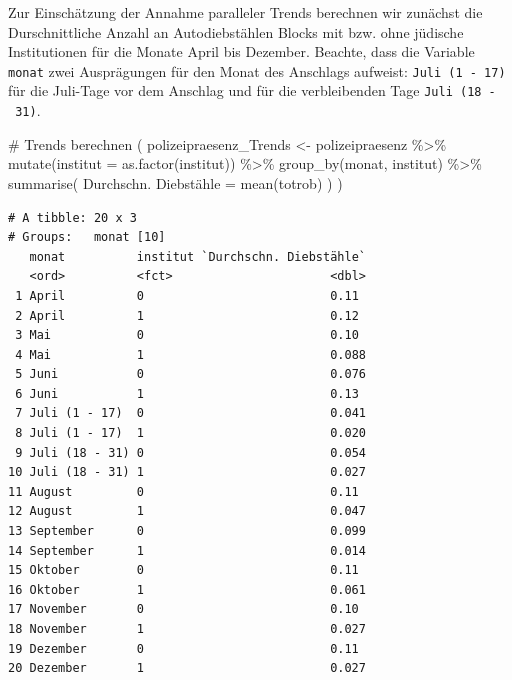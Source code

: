 \documentclass[
  a4paper,
  DIV=11,
  oneside]{scrreprt}
\newenvironment{Shaded}{\begin{snugshade}}{\end{snugshade}}
\newcommand{\AttributeTok}[1]{\textcolor[rgb]{0.40,0.45,0.13}{#1}}
\newcommand{\CommentTok}[1]{\textcolor[rgb]{0.37,0.37,0.37}{#1}}
\newcommand{\FunctionTok}[1]{\textcolor[rgb]{0.28,0.35,0.67}{#1}}
\newcommand{\NormalTok}[1]{\textcolor[rgb]{0.00,0.23,0.31}{#1}}
\newcommand{\OtherTok}[1]{\textcolor[rgb]{0.00,0.23,0.31}{#1}}
\newcommand{\SpecialCharTok}[1]{\textcolor[rgb]{0.37,0.37,0.37}{#1}}
\newcommand{\StringTok}[1]{\textcolor[rgb]{0.13,0.47,0.30}{#1}}
\begin{document}
Zur Einschätzung der Annahme paralleler Trends berechnen wir zunächst
die Durschnittliche Anzahl an Autodiebstählen Blocks mit bzw. ohne
jüdische Institutionen für die Monate April bis Dezember. Beachte, dass
die Variable \texttt{monat} zwei Ausprägungen für den Monat des
Anschlags aufweist: \texttt{Juli\ (1\ -\ 17)} für die Juli-Tage vor dem
Anschlag und für die verbleibenden Tage \texttt{Juli\ (18\ -\ 31)}.

\begin{Shaded}
\begin{Highlighting}[]
\CommentTok{\# Trends berechnen}
\NormalTok{(}
\NormalTok{  polizeipraesenz\_Trends }\OtherTok{\textless{}{-}}\NormalTok{ polizeipraesenz }\SpecialCharTok{\%\textgreater{}\%}
    \FunctionTok{mutate}\NormalTok{(}\AttributeTok{institut =} \FunctionTok{as.factor}\NormalTok{(institut)) }\SpecialCharTok{\%\textgreater{}\%}
    \FunctionTok{group\_by}\NormalTok{(monat, institut) }\SpecialCharTok{\%\textgreater{}\%}
    \FunctionTok{summarise}\NormalTok{(}
      \StringTok{\textasciigrave{}}\AttributeTok{Durchschn. Diebstähle}\StringTok{\textasciigrave{}} \OtherTok{=} \FunctionTok{mean}\NormalTok{(totrob)}
\NormalTok{    )}
\NormalTok{)}
\end{Highlighting}
\end{Shaded}

\begin{verbatim}
# A tibble: 20 x 3
# Groups:   monat [10]
   monat          institut `Durchschn. Diebstähle`
   <ord>          <fct>                      <dbl>
 1 April          0                          0.11 
 2 April          1                          0.12 
 3 Mai            0                          0.10 
 4 Mai            1                          0.088
 5 Juni           0                          0.076
 6 Juni           1                          0.13 
 7 Juli (1 - 17)  0                          0.041
 8 Juli (1 - 17)  1                          0.020
 9 Juli (18 - 31) 0                          0.054
10 Juli (18 - 31) 1                          0.027
11 August         0                          0.11 
12 August         1                          0.047
13 September      0                          0.099
14 September      1                          0.014
15 Oktober        0                          0.11 
16 Oktober        1                          0.061
17 November       0                          0.10 
18 November       1                          0.027
19 Dezember       0                          0.11 
20 Dezember       1                          0.027
\end{verbatim}
\end{document}
